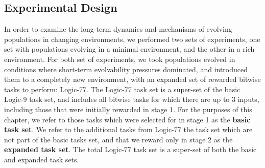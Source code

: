 \documentclass[PhD]{msu-thesis}
\begin{document}
\subsection{Experimental Design}
In order to examine the long-term dynamics and mechanisms of evolving populations in changing environments, we performed two sets of experiments, one set with populations evolving in a minimal environment, and the other in a rich environment. For both set of experiments, we took populations evolved in conditions where short-term evolvability pressures dominated, and introduced them to a completely new environment, with an expanded set of rewarded bitwise tasks to perform: Logic-77. The Logic-77 task set is a super-set of the basic Logic-9 task set, and includes all bitwise tasks for which there are up to 3 inputs, including those that were initially rewarded in stage 1. For the purposes of this chapter, we refer to those tasks which were selected for in stage 1 as the \textbf{basic task set}. We refer to the additional tasks from Logic-77 the task set which are not part of the basic tasks set, and that we reward only in stage 2 as the \textbf{expanded task set}. The total Logic-77 task set is a super-set of both the basic and expanded task sets.  

\end{document}

